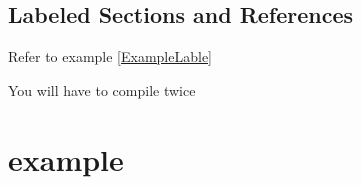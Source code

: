 \documentclass{article}
\begin{document}
\subsection{Labeled Sections and References}
Refer to example \ref{ExampleLable}

You will have to compile twice

\section{example \label{ExampleLable}}
\end{document}
